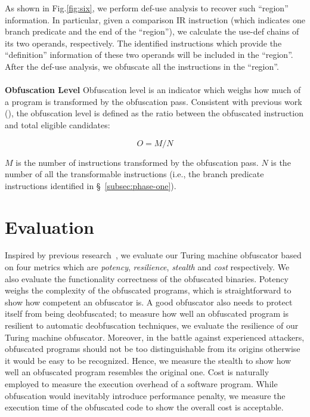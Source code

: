 \documentclass[lnicst]{svmultln}
\newcommand{\F}{Fig.}
\begin{document}
As shown in \F\ref{fig:six}, we perform def-use analysis to recover such
``region'' information. In particular, given a comparison IR instruction (which
indicates one branch predicate and the end of the ``region''), we calculate the
use-def chains of its two operands, respectively. The identified instructions
which provide the ``definition'' information of these two operands will be
included in the ``region''. After the def-use analysis, we obfuscate all the
instructions in the ``region''.
\\\\
\noindent \textbf{Obfuscation Level} Obfuscation level is an indicator which
weighs how much of a program is transformed by the obfuscation pass. Consistent
with previous work (\cite{Trans}), the obfuscation level is defined as the ratio
between the obfuscated instruction and total eligible candidates:

\[ O = M / N \]

\(M\) is the number of instructions transformed by the obfuscation pass. \(N\)
is the number of all the transformable instructions (i.e., the branch predicate
instructions identified in \S~\ref{subsec:phase-one}).

\section{Evaluation}
\label{sec:evaluation}
Inspired by previous research~\cite{Collberg, Ma, Maieee}, we evaluate our
Turing machine obfuscator based on four metrics which are
\textit{potency}, \textit{resilience}, \textit{stealth} and \textit{cost}
respectively. We also evaluate the functionality correctness of the obfuscated
binaries. Potency weighs the complexity of the obfuscated programs, which is
straightforward to show how competent an obfuscator is. A good obfuscator also
needs to protect itself from being deobfuscated; to measure how well an
obfuscated program is resilient to automatic deobfuscation techniques, we
evaluate the resilience of our Turing machine obfuscator. Moreover, in the
battle against experienced attackers, obfuscated programs should not be too
distinguishable from its origins otherwise it would be easy to be recognized.
Hence, we measure the stealth to show how well an obfuscated program resembles
the original one. Cost is naturally employed to measure the execution overhead
of a software program. While obfuscation would inevitably introduce performance
penalty, we measure the execution time of the obfuscated code to show the
overall cost is acceptable.
\end{document}
